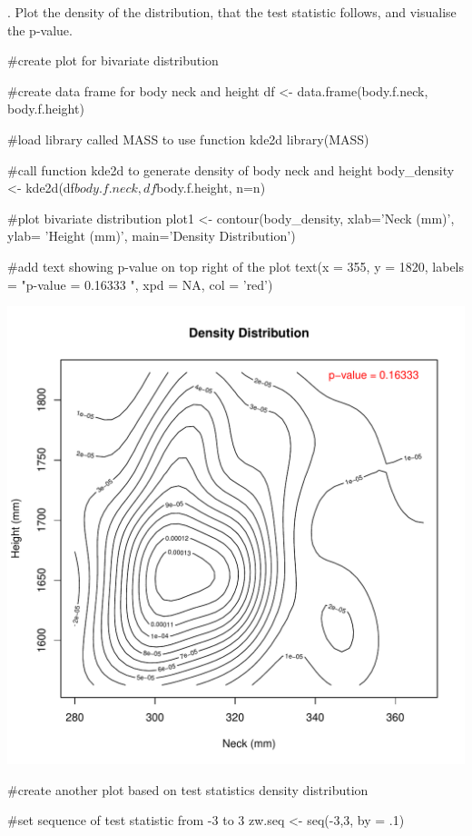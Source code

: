 \documentclass[12pt, oneside]{report}\usepackage[]{graphicx}\usepackage[]{color}
\makeatletter
\def\maxwidth{ %
  \ifdim\Gin@nat@width>\linewidth
    \linewidth
  \else
    \Gin@nat@width
  \fi
}
\makeatother
\begin{document}
. Plot the density of the distribution, that the test statistic follows, and visualise the p-value.
\begin{Schunk}
\begin{Sinput}
#create plot for bivariate distribution

#create data frame for body neck and height
df <- data.frame(body.f.neck, body.f.height)

#load library called MASS to use function kde2d
library(MASS)

#call function kde2d to generate density of body neck and height
body_density <- kde2d(df$body.f.neck, df$body.f.height, n=n)

#plot bivariate distribution
plot1 <- contour(body_density, xlab='Neck (mm)', ylab= 'Height (mm)', main='Density Distribution')

#add text showing p-value on top right of the plot
text(x = 355, y = 1820, labels = "p-value = 0.16333 ", xpd = NA, col = 'red')
\end{Sinput}

\includegraphics[width=\maxwidth]{figure/unnamed-chunk-7-1} \begin{Sinput}
#create another plot based on test statistics density distribution

#set sequence of test statistic from -3 to 3
zw.seq <- seq(-3,3, by = .1) 


\end{Sinput}
\end{Schunk}
\end{document}
